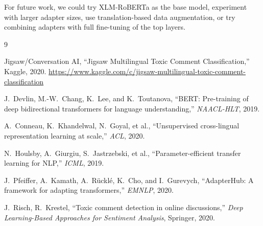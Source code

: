 \documentclass[11pt,a4paper]{article}
\begin{document}
For future work, we could try XLM-RoBERTa as the base model, experiment with
larger adapter sizes, use translation-based data augmentation, or try combining
adapters with full fine-tuning of the top layers.

\begin{thebibliography}{9}

Jigsaw/Conversation AI,
``Jigsaw Multilingual Toxic Comment Classification,''
Kaggle, 2020.
\url{https://www.kaggle.com/c/jigsaw-multilingual-toxic-comment-classification}

J.~Devlin, M.-W.~Chang, K.~Lee, and K.~Toutanova,
``BERT: Pre-training of deep bidirectional transformers for language understanding,''
\textit{NAACL-HLT}, 2019.

A.~Conneau, K.~Khandelwal, N.~Goyal, et al.,
``Unsupervised cross-lingual representation learning at scale,''
\textit{ACL}, 2020.

N.~Houlsby, A.~Giurgiu, S.~Jastrzebski, et al.,
``Parameter-efficient transfer learning for NLP,''
\textit{ICML}, 2019.

J.~Pfeiffer, A.~Kamath, A.~R\"{u}ckl\'{e}, K.~Cho, and I.~Gurevych,
``AdapterHub: A framework for adapting transformers,''
\textit{EMNLP}, 2020.

J.~Risch, R.~Krestel,
``Toxic comment detection in online discussions,''
\textit{Deep Learning-Based Approaches for Sentiment Analysis}, Springer, 2020.

\end{thebibliography}
\end{document}
